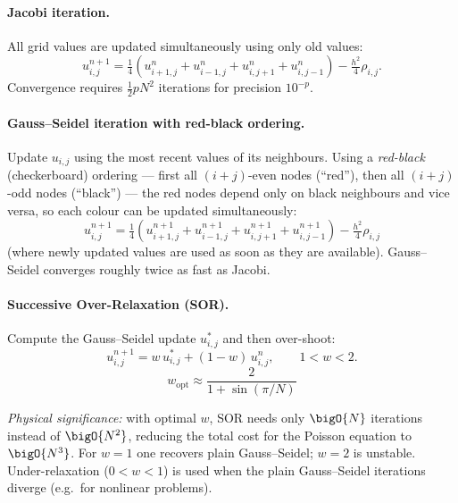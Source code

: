 \paragraph{Jacobi iteration.}
All grid values are updated simultaneously using only old values:
\begin{equation}
  u_{i,j}^{n+1}
  = \tfrac{1}{4}\!\left(
      u_{i+1,j}^{n}+u_{i-1,j}^{n}+u_{i,j+1}^{n}+u_{i,j-1}^{n}
    \right)
    -\tfrac{h^2}{4}\rho_{i,j}.
  \label{eq:lec08:jacobi}
\end{equation}
Convergence requires $\tfrac{1}{2}pN^2$ iterations for precision
$10^{-p}$.

\paragraph{Gauss–Seidel iteration with red-black ordering.}
Update $u_{i,j}$ using the most recent values of its neighbours.
Using a \emph{red-black} (checkerboard) ordering — first all
$(i+j)$-even nodes (``red''), then all $(i+j)$-odd nodes (``black'')
— the red nodes depend only on black neighbours and vice versa, so each
colour can be updated simultaneously:
\begin{equation}
  u_{i,j}^{n+1}
  = \tfrac{1}{4}\!\left(
      u_{i+1,j}^{n+1}+u_{i-1,j}^{n+1}
      +u_{i,j+1}^{n+1}+u_{i,j-1}^{n+1}
    \right)
    -\tfrac{h^2}{4}\rho_{i,j}
  \label{eq:lec08:gauss-seidel}
\end{equation}
(where newly updated values are used as soon as they are
available). Gauss–Seidel converges roughly twice as fast as Jacobi.

\paragraph{Successive Over-Relaxation (SOR).}
Compute the Gauss–Seidel update $u^*_{i,j}$ and then over-shoot:
\begin{equation}
  u_{i,j}^{n+1}
  = w\,u^*_{i,j} + (1-w)\,u_{i,j}^{n},
  \qquad 1 < w < 2.
  \label{eq:lec08:sor}
\end{equation}
\begin{equation}
  \boxed{w_{\mathrm{opt}}
    \approx \frac{2}{1+\sin(\pi/N)}}
  \label{eq:lec08:sor-optimal}
\end{equation}

\textit{Physical significance:} with optimal $w$, SOR needs only
$\bigO{N}$ iterations instead of $\bigO{N^2}$, reducing the total
cost for the Poisson equation to $\bigO{N^3}$.  For $w=1$ one
recovers plain Gauss–Seidel; $w=2$ is unstable.  Under-relaxation
($0<w<1$) is used when the plain Gauss–Seidel iterations diverge
(e.g.\ for nonlinear problems).

